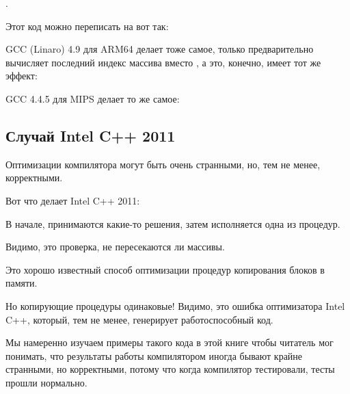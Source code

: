 .

Этот код можно переписать на \CCpp вот так:



GCC (Linaro) 4.9 для ARM64 делает тоже самое, только предварительно вычисляет последний индекс массива  вместо
, а это, конечно, имеет тот же эффект:




GCC 4.4.5 для MIPS делает то же самое:



\subsection{Случай Intel C++ 2011}
\myindex{\CompilerAnomaly}
\label{loops_iterators_loop_anomaly}

Оптимизации компилятора могут быть очень странными, но, тем не менее, корректными.

Вот что делает Intel C++ 2011:



В начале, принимаются какие-то решения, затем исполняется одна из процедур.

Видимо, это проверка, не пересекаются ли массивы.

Это хорошо известный способ оптимизации процедур копирования блоков в памяти.

Но копирующие процедуры одинаковые!
Видимо, это ошибка оптимизатора Intel C++, который, тем не менее, генерирует работоспособный код.

Мы намеренно изучаем примеры такого кода в этой книге чтобы читатель мог понимать, что результаты работы
компилятором иногда бывают крайне странными, но корректными, потому что когда компилятор тестировали, 
тесты прошли нормально.%

